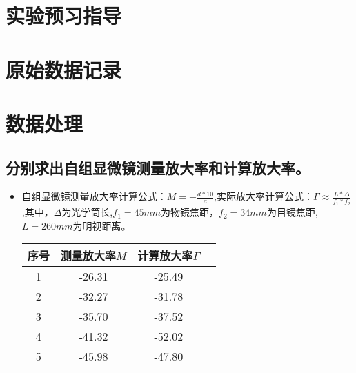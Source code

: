 \documentclass[signature=data]{physicsreport}
\begin{document}
\maketitle

\section{实验预习指导}
\newpage

\section{原始数据记录}
\makeatletter
{}
\makeatother

\newpage

\section{数据处理}
\subsection{分别求出自组显微镜测量放大率和计算放大率。}

\begin{itemize}
    \item 自组显微镜测量放大率计算公式：$M=-\frac{d*10}{a}$,实际放大率计算公式：$\Gamma \approx \frac{L*\Delta}{f_1*f_2}$,其中，$\Delta$为光学筒长,$f_1=45mm$为物镜焦距，$f_2=34mm$为目镜焦距,$L=260mm$为明视距离。
    \begin{table}[h!]
        \centering
        \begin{tabular}{|c|c|c|c|}
        \hline
        序号  & 测量放大率$M$  & 计算放大率$\Gamma$\\
        \hline
        1 & -26.31 & -25.49\\
        \hline
        2 & -32.27 & -31.78\\
        \hline
        3 & -35.70 & -37.52\\
        \hline
        4 & -41.32 & -52.02\\
        \hline
        5 & -45.98 & -47.80\\
        \hline
        \end{tabular}
        \label{tab:experiment_data1}
    \end{table}
\end{itemize}
\end{document}
